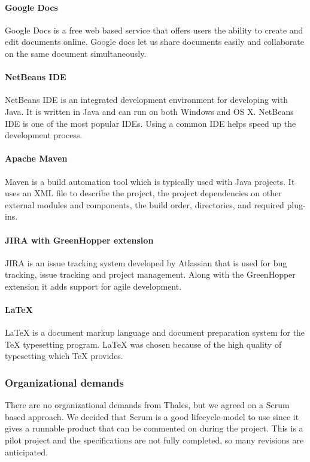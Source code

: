 \paragraph{Google Docs}
Google Docs is a free web based service that offers users the ability to create and edit documents online. Google docs let us share documents easily and collaborate on the same document simultaneously.    

\paragraph{NetBeans IDE}
NetBeans IDE is an integrated development environment for developing with Java. It is written in Java and can run on both Windows and OS X. NetBeans IDE is one of the most popular IDEs. Using a common IDE helps speed up the development process.

\paragraph{Apache Maven}
Maven is a build automation tool which is typically used with Java projects. It uses an XML file to describe the project, the project dependencies on other external modules and components, the build order, directories, and required plug-ins.   

\paragraph{JIRA with GreenHopper extension}
JIRA is an issue tracking system developed by Atlassian that is used for bug tracking, issue tracking and project management. Along with the GreenHopper extension it adds support for agile development.

\paragraph{LaTeX}
LaTeX is a document markup language and document preparation system for the TeX typesetting program. LaTeX was chosen because of the high quality of typesetting which TeX provides.

\subsubsection{Organizational demands}
There are no organizational demands from Thales, but we agreed on a Scrum based approach. We decided that Scrum is a good lifecycle-model to use since it gives a runnable product that can be commented on during the project. This is a pilot project and the specifications are not fully completed, so many revisions are anticipated.


